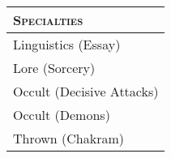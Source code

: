 \begin{figure}[b!]
    \noindent%
    \begin{minipage}[t]{\dimexpr0.60\linewidth - 10pt}%
        \PrintArmorList
    \end{minipage}%
    \hspace{\fill}%
    \begin{minipage}[t]{\dimexpr0.40\linewidth - 10pt}%
        \begin{xltabular}{\textwidth}{X}
            \bfseries\scshape Specialties \\
            \hline%
            \endhead%
            Linguistics (Essay) \\
            Lore (Sorcery) \\
            Occult (Decisive Attacks) \\
            Occult (Demons) \\
            Thrown (Chakram) \\
        \end{xltabular}
    \end{minipage}

    \vspace{0.5\baselineskip}

    \PrintPools

    \vspace{-\baselineskip}

    \begin{minipage}[t]{\dimexpr0.60\linewidth - 10pt}%
        \PrintHealthLevels%
    \end{minipage}%
    \hspace{\fill}%
    \begin{minipage}[t]{\dimexpr0.40\linewidth - 10pt}%
        \PrintMiscStats
    \end{minipage}
\end{figure}


\PrintAttributeList

\vspace{0pt plus 12pt minus 12pt}

\PrintAbilityList

\vspace{0pt plus 12pt minus 12pt}

\PrintWeaponList


\cleardoublepage
{}
\PrintCharmList{}

\twocolumn


